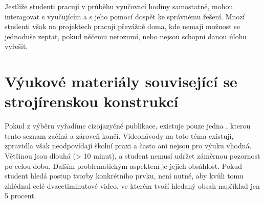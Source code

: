     Jestliže studenti pracují v průběhu vyučovací hodiny samostatně, mohou interagovat s vyučujícím a s jeho pomocí dospět ke správnému řešení.
    Mnozí studenti však na projektech pracují převážně doma, kde nemají možnost se jednoduše zeptat, pokud něčemu nerozumí, nebo nejsou schopni danou úlohu vyřešit.

\section{Výukové materiály související se strojírenskou konstrukcí}
    Pokud z výběru vyřadíme cizojazyčné publikace, existuje pouze jedna , kterou tento seznam začíná a zároveň končí. 
    Videonávody na toto téma existují, zpravidla však neodpovídají školní praxi a často ani nejsou pro výuku vhodná.
    Většinou jsou dlouhá (> 10 minut), a student nemusí udržet záměrnou pozornost po celou dobu.
    Dalším problematickým aspektem je jejich obsáhlost.
    Pokud student hledá postup tvorby konkrétního prvku, není nutné, aby kvůli tomu zhlédnul celé dvacetiminutové video, ve kterém tvoří hledaný obsah například jen 5 procent. 
